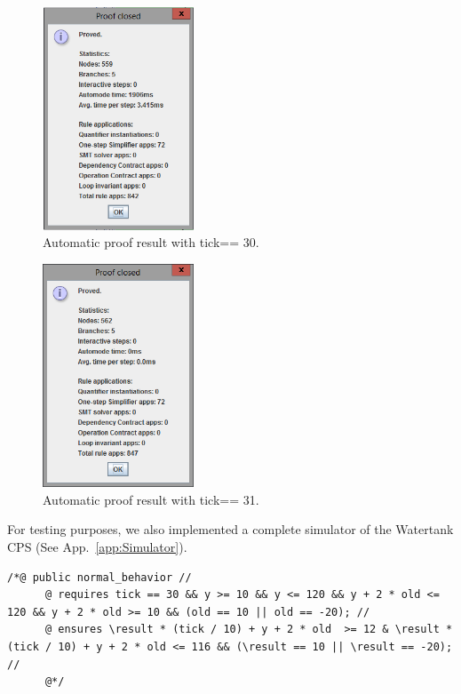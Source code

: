 \begin{figure}
	\centering
	\includegraphics[width=0.4\textwidth]{images/verKey1}
	\caption{Automatic proof result with tick== 30.}
	\label{fig:keyVer1}
\end{figure}

\begin{figure}
	\centering
	\includegraphics[width=0.4\textwidth]{images/verKey2}
	\caption{Automatic proof result with tick== 31.}
	\label{fig:keyVer2}
\end{figure}


For testing purposes, we also implemented a complete simulator of the Watertank CPS (See App.~\ref{app:Simulator}).

\begin{lstlisting}[label=lst:JDL]
	/*@ public normal_behavior //
	  @ requires tick == 30 && y >= 10 && y <= 120 && y + 2 * old <= 120 && y + 2 * old >= 10 && (old == 10 || old == -20); //
	  @ ensures \result * (tick / 10) + y + 2 * old  >= 12 & \result * (tick / 10) + y + 2 * old <= 116 && (\result == 10 || \result == -20); //
	  @*/
\end{lstlisting} 

